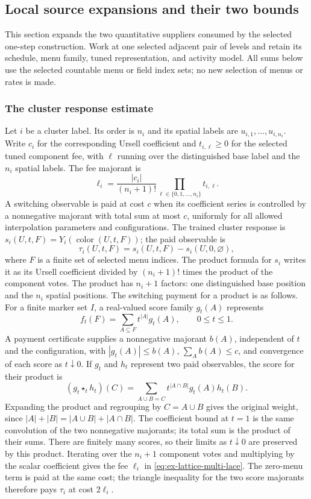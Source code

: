 \subsection{Local source expansions and their two bounds}
\label{sec:ex-lattice-rg-multisource}

This section expands the two quantitative suppliers consumed by the selected
one-step construction. Work at one selected adjacent pair of levels and
retain its schedule, menu family, tuned representation, and activity model.
All sums below use the selected countable menu or field index sets; no new
selection of menus or rates is made.

\subsubsection{The cluster response estimate}
\label{subsec:ex-lattice-rg-usable}

Let $i$ be a cluster label. Its order is $n_i$ and its spatial labels are
$u_{i,1},\ldots,u_{i,n_i}$. Write $c_i$ for the corresponding Ursell
coefficient and $t_{i,\ell}\geq0$ for the selected tuned component fee, with
$\ell$ running over the distinguished base label and the $n_i$ spatial
labels. The fee majorant is
\begin{equation}
 \ell_i=\frac{|c_i|}{(n_i+1)!}
          \prod_{\ell\in\{0,1,\ldots,n_i\}}t_{i,\ell}.
 \label{eq:ex-lattice-multi-lace}
\end{equation}
A switching observable is paid at cost $c$ when its coefficient series is
controlled by a nonnegative majorant with total sum at most $c$, uniformly
for all allowed interpolation parameters and configurations. The trained
cluster response is
$s_i(U,t,F)=Y_{i}(\operatorname{color}(U,t,F))$; the paid observable is
\[
 \tau_i(U,t,F)=s_i(U,t,F)-s_i(U,0,\varnothing),
\]
where $F$ is a finite set of selected menu indices. The product formula for
$s_i$ writes it as its Ursell coefficient divided by $(n_i+1)!$ times the
product of the component votes. The product has $n_i+1$ factors: one distinguished base position and the
$n_i$ spatial positions. The switching payment for a
product is as follows. For a finite marker set $I$, a real-valued score family $g_t(A)$
represents
\[
 f_t(F)=\sum_{A\subseteq F}t^{|A|}g_t(A),\qquad 0\leq t\leq1.
\]
A payment certificate supplies a nonnegative majorant $b(A)$, independent
of $t$ and the configuration, with $|g_t(A)|\leq b(A)$,
$\sum_A b(A)\leq c$, and convergence of each score as $t\downarrow0$.
If $g_t$ and $h_t$ represent two paid observables, the score for their
product is
\[
 (g_t\star_t h_t)(C)=\sum_{A\cup B=C}t^{|A\cap B|}g_t(A)h_t(B).
\]
Expanding the product and regrouping by $C=A\cup B$ gives the original
weight, since $|A|+|B|=|A\cup B|+|A\cap B|$. The coefficient bound at
$t=1$ is the same convolution of the two nonnegative majorants; its total
sum is the product of their sums. There are finitely many scores, so their
limits as $t\downarrow0$ are preserved by this product. Iterating over the $n_i+1$ component votes
and multiplying by the scalar coefficient gives the fee $\ell_i$ in
\eqref{eq:ex-lattice-multi-lace}. The zero-menu term is paid at the same
cost; the triangle inequality for the two score majorants therefore pays
$\tau_i$ at cost $2\ell_i$.


